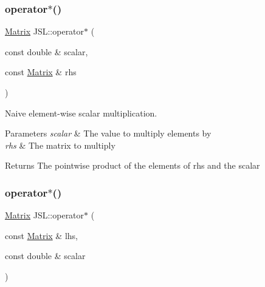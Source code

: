 \mbox{\label{namespaceJSL_a80fcd230a03dd81f1c37fec030619bf9}} 
\subsubsection{\texorpdfstring{operator$\ast$()}{operator*()}\hspace{0.1cm}{\footnotesize\ttfamily [7/8]}}
{\footnotesize\ttfamily \hyperlink{classJSL_1_1Matrix}{Matrix} J\+S\+L\+::operator$\ast$ (\begin{DoxyParamCaption}\item[{const double \&}]{scalar,  }\item[{const \hyperlink{classJSL_1_1Matrix}{Matrix} \&}]{rhs }\end{DoxyParamCaption})\hspace{0.3cm}{\ttfamily [inline]}}



Naive element-\/wise scalar multiplication. 


\begin{DoxyParams}{Parameters}
{\em scalar} & The value to multiply elements by \\
\hline
{\em rhs} & The matrix to multiply \\
\hline
\end{DoxyParams}
\begin{DoxyReturn}{Returns}
The pointwise product of the elements of rhs and the scalar 
\end{DoxyReturn}
\mbox{\label{namespaceJSL_a69548e09ba5835ee87ac4d28907b5435}} 
\subsubsection{\texorpdfstring{operator$\ast$()}{operator*()}\hspace{0.1cm}{\footnotesize\ttfamily [8/8]}}
{\footnotesize\ttfamily \hyperlink{classJSL_1_1Matrix}{Matrix} J\+S\+L\+::operator$\ast$ (\begin{DoxyParamCaption}\item[{const \hyperlink{classJSL_1_1Matrix}{Matrix} \&}]{lhs,  }\item[{const double \&}]{scalar }\end{DoxyParamCaption})\hspace{0.3cm}{\ttfamily [inline]}}




